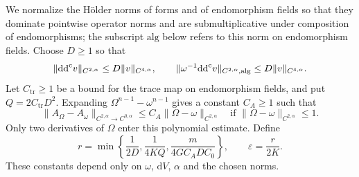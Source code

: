We normalize the H\"older norms of forms and of endomorphism fields so that they dominate pointwise operator norms and are submultiplicative under composition of endomorphisms; the subscript $\mathrm{alg}$ below refers to this norm on endomorphism fields. Choose $D\geq1$ so that
\[
 \|\mathrm{dd}^{\mathrm{c}} v\|_{C^{2,\alpha}}\leq D\|v\|_{C^{4,\alpha}},\qquad
 \|\omega^{-1}\mathrm{dd}^{\mathrm{c}} v\|_{C^{2,\alpha},\mathrm{alg}}
                      \leq D\|v\|_{C^{4,\alpha}}.
\]
Let $C_{\mathrm{tr}}\geq1$ be a bound for the trace map on endomorphism fields, and put $Q=2C_{\mathrm{tr}}D^2$. Expanding $\Omega^{n-1}-\omega^{n-1}$ gives a constant $C_A\geq1$ such that
\[
 \|A_\Omega-A_\omega\|_{C^{2,\alpha}\to C^{0,\alpha}}
       \leq C_A\|\Omega-\omega\|_{C^{2,\alpha}}
 \quad\text{if }\|\Omega-\omega\|_{C^{2,\alpha}}\leq1.
\]
Only two derivatives of $\Omega$ enter this polynomial estimate. Define
\begin{equation}\label{eq:gaud-local-adjoint-radius}
 r=\min\left\{\frac1{2D},\frac1{4KQ},
                   \frac{m}{4GC_ADC_0}\right\},
 \qquad \varepsilon=\frac r{2K}.
\end{equation}
These constants depend only on $\omega$, $\mathrm{d}V$, $\alpha$ and the chosen norms.

